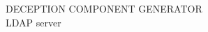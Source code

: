 \documentclass[a4paper,11pt]{report}
\begin{document}
    \begin{center}
        \vspace{5mm}
        {\large \uppercase{Deception component generator}}\\
        \vspace{5mm}
        {\large LDAP server}
    \end{center}



    \tableofcontents
    
    
    
    
    
    
\end{document}

